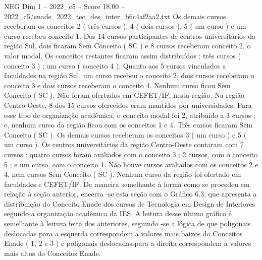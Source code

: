 \begin{textsample}{NEG Dim 1 – 2022\_c5 – Score 18.00 – 2022\_c5/enade\_2022\_tec\_des\_inter\_b6c4af2aa2.txt}
Os demais cursos receberam os conceitos 2 ( três cursos ), 4 ( dois cursos ), 5 ( um curso ) e um curso recebeu conceito 1.
Dos 14 cursos participantes de centros universitários da região Sul, dois ficaram Sem Conceito ( SC ) e 8 cursos receberam conceito 2, o valor modal.
Os conceitos restantes ficaram assim distribuídos : três cursos ( conceito 3 ) ; um curso ( conceito 4 ).
Quanto aos 5 cursos vinculados a faculdades na região Sul, um curso recebeu o conceito 2, dois cursos receberam o conceito 3 e dois cursos receberam o conceito 4.
Nenhum curso ficou Sem Conceito ( SC ).
Não foram ofertados em CEFET/IF, nesta região.
Na região Centro-Oeste, 8 dos 15 cursos oferecidos eram mantidos por universidades.
Para esse tipo de organização acadêmica, o conceito modal foi 2, atribuído a 3 cursos ; e, nenhum curso da região ficou com os conceitos 1 e 4.
Três cursos ficaram Sem Conceito ( SC ).
Os demais cursos receberam os conceitos 3 ( um curso ) e 5 ( um curso ).
Os centros universitários da região Centro-Oeste contaram com 7 cursos : quatro cursos foram avaliados com o conceito 3 ; 2 cursos, com o conceito 5 ; e um curso, com o conceito 1.
Não houve cursos avaliados com os conceitos 2 e 4, nem cursos Sem Conceito ( SC ).
Nenhum curso da região foi ofertado em faculdades e CEFET/IF.
De maneira semelhante à forma como se procedeu em relação à seção anterior, encerra -se esta seção com o Gráfico 6.3, que apresenta a distribuição do Conceito Enade dos cursos de Tecnologia em Design de Interiores segundo a organização acadêmica da IES.
A leitura desse último gráfico é semelhante à leitura feita dos anteriores, seguindo -se a lógica de que poligonais deslocadas para a esquerda correspondem a valores mais baixos do Conceitos Enade ( 1, 2 e 3 ) e poligonais deslocadas para a direita correspondem a valores mais altos do Conceitos Enade.

\end{textsample}
